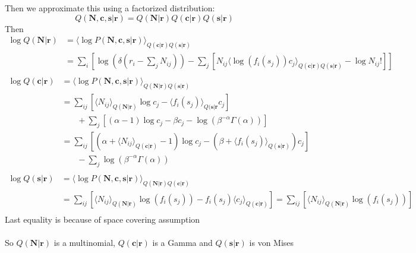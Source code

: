 \documentclass[12pt]{article}
\begin{document}
Then we approximate this using a factorized distribution:\\
\begin{equation}
Q(\mathbf{N, c, s|r}) = Q(\mathbf{N|r}) Q(\mathbf{c|r}) Q(\mathbf{s|r})
\end{equation}
Then
\begin{equation}
\begin{aligned}
\log Q(\mathbf{N|r}) &= \langle \log P(\mathbf{N, c, s|r}) \rangle_{Q(\mathbf{c|r})Q(\mathbf{s|r})}\\
&= \sum_i [\log(\delta(r_i - \sum_j N_{ij})) - \sum_j [N_{ij} \langle \log(f_i (s_j)) c_j \rangle_{Q(\mathbf{c|r})Q(\mathbf{s|r})} - \log N_{ij}!]]\\
\end{aligned}
\end{equation}
\begin{equation}
\begin{aligned}
\log Q(\mathbf{c|r}) &= \langle \log P(\mathbf{N, c, s|r}) \rangle_{Q(\mathbf{N|r})Q(\mathbf{s|r})}\\
&= \sum_{ij} [\langle N_{ij} \rangle_{Q(\mathbf{N|r})} \log c_j - \langle f_i (s_j)\rangle_{Q(\mathbf{s|r}}c_j]\\
& \phantom{{}=1}+ \sum_j [(\alpha - 1) \log c_j - \beta c_j - \log (\beta^{- \alpha} \Gamma (\alpha))]\\
&= \sum_{ij} [(\alpha + \langle N_{ij} \rangle_{Q(\mathbf{c|r})} - 1) \log c_j - (\beta + \langle f_i (s_j)\rangle_{Q(\mathbf{s|r})}) c_j]\\
& \phantom{{}=1}- \sum_j \log (\beta^{- \alpha} \Gamma (\alpha))\\
\end{aligned}
\end{equation}
\begin{equation}
\begin{aligned}
\log Q(\mathbf{s|r}) &= \langle \log P(\mathbf{N, c, s|r}) \rangle_{Q(\mathbf{N|r})Q(\mathbf{c|r})}\\
&= \sum_{ij} [\langle N_{ij} \rangle_{Q(\mathbf{N|r})} \log(f_i(s_j)) - f_i(s_j) \langle c_j \rangle_{Q(\mathbf{c|r})}] = \sum_{ij} [\langle N_{ij} \rangle_{Q(\mathbf{N|r})} \log(f_i(s_j))]\\
\end{aligned}
\end{equation}
Last equality is because of space covering assumption\\
\\
So $Q(\mathbf{N|r})$ is a multinomial, $Q(\mathbf{c|r})$ is a Gamma and $Q(\mathbf{s|r})$ is von Mises\\
\end{document}
